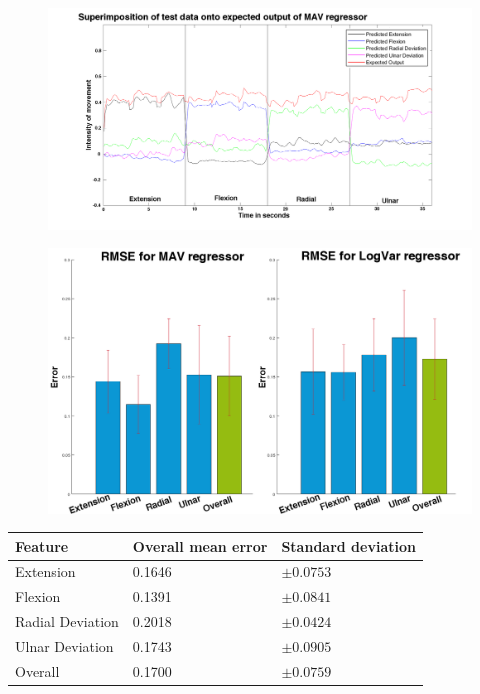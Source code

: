 \begin{figure}[H]
	\includegraphics[width=1\textwidth]{figures/results/NewSuperPoisonMavNewData}  %
	\caption{}
	\label{fig:SuperPoisonMavNewData}  %
\end{figure}


\begin{figure}[H]
	\includegraphics[width=1\textwidth]{figures/results/RMSEBarPlotNewData}  %
	\caption{}
	\label{fig:RMSEBarPlotNewData}  %
\end{figure}

	\begin{center}
		\begin{tabular}{l l l}
			\toprule
			\textbf{Feature} & \textbf{Overall mean error} & \textbf{Standard deviation}\\
			\midrule
			Extension & 0.1646 & $\pm 0.0753$ \\
			Flexion & 0.1391 & $\pm 0.0841$ \\
			Radial Deviation & 0.2018 & $\pm 0.0424$ \\
			Ulnar Deviation & 0.1743 & $\pm 0.0905$ \\
			Overall & 0.1700 & $\pm 0.0759$ \\
			\bottomrule
		\end{tabular}
	\end{center}
	

